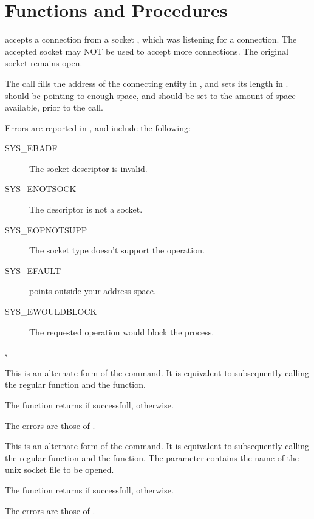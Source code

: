 \section {Functions and Procedures}

{ accepts a connection from a socket , which was
listening for a connection. The accepted socket may NOT be used to accept
more connections. The original socket remains open.

The  call fills the address of the connecting entity in ,
and sets its length in .  should be pointing to
enough space, and  should be set to the amount of space
available, prior to the call.
}
{Errors are reported in , and include the following:
\begin{description}
\item[SYS\_EBADF] The socket descriptor is invalid.
\item[SYS\_ENOTSOCK] The descriptor is not a socket.
\item[SYS\_EOPNOTSUPP] The socket type doesn't support the 
operation.
\item[SYS\_EFAULT]  points outside your address space.
\item[SYS\_EWOULDBLOCK] The requested operation would block the process.
\end{description}
}
{, }

\html{}

{ This is an alternate form of the  command. It is equivalent
to subsequently calling the regular 
function and the  function.

The function returns  if successfull,  otherwise.
}
{The errors are those of .}
{}

{ This is an alternate form of the  command. 
It is equivalent
to subsequently calling the regular  function and the 
 function.
The  parameter contains the name of the unix socket file to be
opened. 

The function returns  if successfull,  otherwise.
}
{The errors are those of .}
{}



